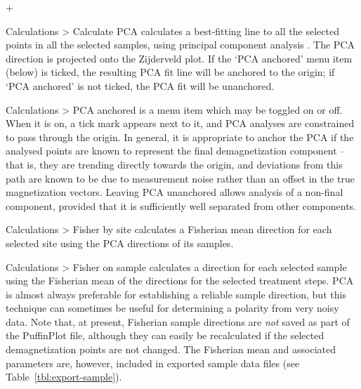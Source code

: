 \documentclass[a4paper,british]{article}
\newcommand{\menuitemlabel}[1]{%
\mbox{\textsf{#1}}\hfil}
\newenvironment{menuitemlist}%
{\begin{list}{}{%
\renewcommand{\makelabel}{\menuitemlabel}%
\setlength{\labelwidth}{35pt}%
\setlength{\leftmargin}%
             {\labelwidth+\labelsep}}}%
{\end{list}}
\newcommand{\caps}[1]{\MakeTextUppercase{#1}} %
\newcommand{\submenu}{ \textgreater{} } %
\begin{document}
\begin{menuitemlist}

\item[Calculations\submenu Calculate \caps{pca}] calculates a best-fitting
  line to all the selected points in all the selected samples, using
  principal component analysis \citep{kirschvink1980least}. The \caps{pca}
  direction is projected onto the Zijderveld plot. If the `\caps{pca}
  anchored' menu item (below) is ticked, the resulting \caps{pca} fit line
  will be anchored to the origin; if `\caps{pca} anchored' is not ticked, the
  \caps{pca} fit will be unanchored.

\item[Calculations\submenu \caps{pca} anchored] is a menu item which may be
  toggled on or off. When it is on, a tick mark appears next to it, and
  \caps{pca} analyses are constrained to pass through the origin. In general,
  it is appropriate to anchor the \caps{pca} if the analysed points are known
  to represent the final demagnetization component -- that is, they are
  trending directly towards the origin, and deviations from this path are
  known to be due to measurement noise rather than an offset in the true
  magnetization vectors. Leaving \caps{pca} unanchored allows analysis of a
  non-final component, provided that it is sufficiently well separated from
  other components.

\item[Calculations\submenu Fisher by site] calculates a Fisherian mean
  direction for each selected site using the \caps{pca} directions of its
  samples.

\item[Calculations\submenu Fisher on sample] calculates a direction for each
  selected sample using the Fisherian mean of the directions for the selected
  treatment steps. \caps{Pca} is almost always preferable for establishing a
  reliable sample direction, but this technique can sometimes be useful for
  determining a polarity from very noisy data. Note that, at present,
  Fisherian sample directions are {\em not} saved as part of the PuffinPlot
  file, although they can easily be recalculated if the selected
  demagnetization points are not changed. The Fisherian mean and associated
  parameters are, however, included in exported sample data files 
  (see Table~\ref{tbl:export-sample}).


\end{menuitemlist}
\end{document}
